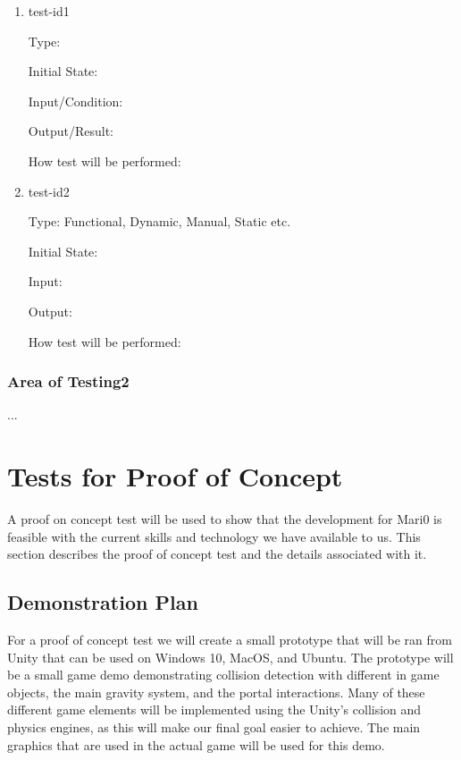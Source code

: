 \documentclass[12pt, titlepage]{article}
\begin{document}
\begin{enumerate}

\item{test-id1\\}

Type: 
					
Initial State: 
					
Input/Condition: 
					
Output/Result: 
					
How test will be performed: 
					
\item{test-id2\\}

Type: Functional, Dynamic, Manual, Static etc.
					
Initial State: 
					
Input: 
					
Output: 
					
How test will be performed: 

\end{enumerate}

\subsubsection{Area of Testing2}

...

\section{Tests for Proof of Concept}

A proof on concept test will be used to show that the development for Mari0 is feasible with the current skills and technology we have available to us. This section describes the proof of concept test and the details associated with it.

\subsection{Demonstration Plan}
For a proof of concept test we will create a small prototype that will be ran from Unity that can be used on Windows 10, MacOS, and Ubuntu. The prototype will be a small game demo demonstrating collision detection with different in game objects, the main gravity system, and the portal interactions. Many of these different game elements will be implemented using the Unity's collision and physics engines, as this will make our final goal easier to achieve. The main  graphics that are used in the actual game will be used for this demo.
\end{document}
